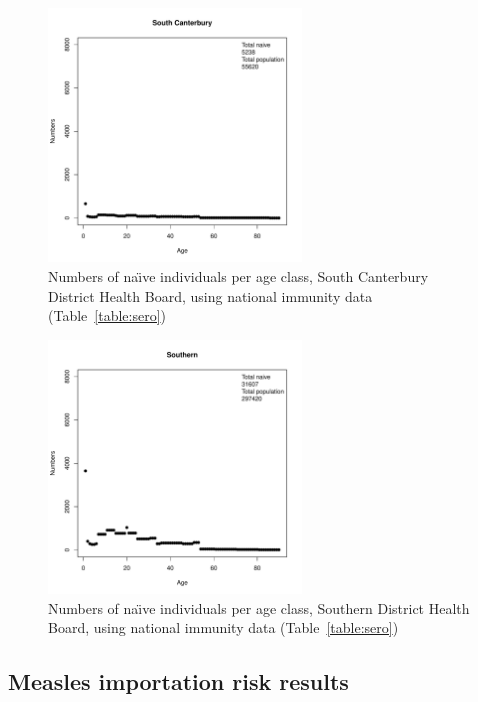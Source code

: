 \documentclass{article}
\begin{document}
\begin{figure}[H]
     \begin{center}
     \includegraphics[width=0.6\textwidth]{dhb19.pdf}
     \end{center}
     \caption{Numbers of na\"{\i}ve individuals per age class, South Canterbury District Health Board, using national immunity data (Table~\autoref{table:sero})}
     \label{fig:SouthCanterbury}
\end{figure}

\begin{figure}[H]
     \begin{center}
     \includegraphics[width=0.6\textwidth]{dhb20.pdf}
     \end{center}
     \caption{Numbers of na\"{\i}ve individuals per age class, Southern District Health Board, using national immunity data (Table~\autoref{table:sero})}
     \label{fig:Southern}
\end{figure}

\subsection{Measles importation risk results}
\end{document}
